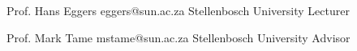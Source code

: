 

\begin{cvhonors}

  \cvhonor
    {Prof. Hans Eggers} %
    {eggers@sun.ac.za} %
    {Stellenbosch University} %
    {Lecturer} %

  \cvhonor
    {Prof. Mark Tame} %
    {mstame@sun.ac.za}
    {Stellenbosch University} %
    {Advisor} %

\end{cvhonors}

